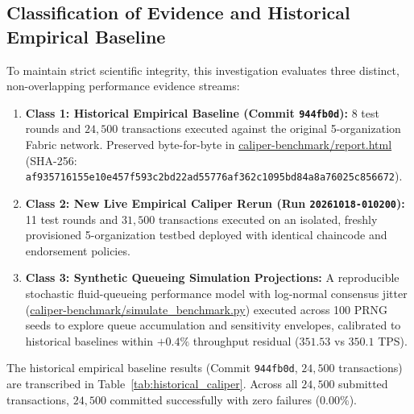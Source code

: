 \documentclass[runningheads]{llncs}
\begin{document}
\subsection{Classification of Evidence and Historical Empirical Baseline}
To maintain strict scientific integrity, this investigation evaluates three distinct, non-overlapping performance evidence streams:
\begin{enumerate}
    \item \textbf{Class 1: Historical Empirical Baseline (Commit \texttt{944fb0d}):} 8 test rounds and $24,500$ transactions executed against the original 5-organization Fabric network. Preserved byte-for-byte in \url{caliper-benchmark/report.html} (SHA-256: \texttt{af935716155e10e4\allowbreak 57f593c2bd22ad55\allowbreak 776af362c1095bd8\allowbreak 4a8a76025c856672}).
    \item \textbf{Class 2: New Live Empirical Caliper Rerun (Run \texttt{20261018-010200}):} 11 test rounds and $31,500$ transactions executed on an isolated, freshly provisioned 5-organization testbed deployed with identical chaincode and endorsement policies.
    \item \textbf{Class 3: Synthetic Queueing Simulation Projections:} A reproducible stochastic fluid-queueing performance model with log-normal consensus jitter (\url{caliper-benchmark/simulate_benchmark.py}) executed across 100 PRNG seeds to explore queue accumulation and sensitivity envelopes, calibrated to historical baselines within $+0.4\%$ throughput residual ($351.53$ vs $350.1$ TPS).
\end{enumerate}

The historical empirical baseline results (Commit \texttt{944fb0d}, $24,500$ transactions) are transcribed in Table~\ref{tab:historical_caliper}. Across all $24,500$ submitted transactions, $24,500$ committed successfully with zero failures ($0.00\%$).
\end{document}
